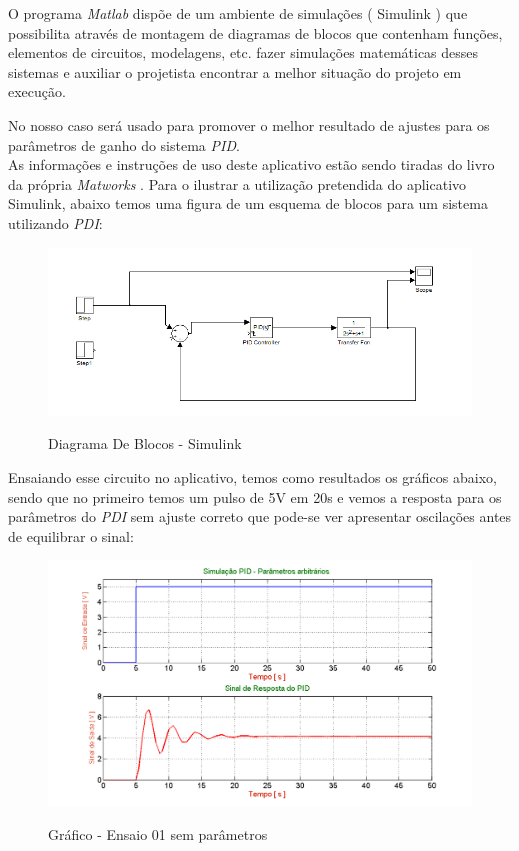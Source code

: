 O programa \emph{Matlab\tiny\textregistered} dispõe de um ambiente de simulações ( Simulink ) que possibilita através de montagem de diagramas de blocos que contenham funções, elementos de circuitos, modelagens, etc. fazer simulações matemáticas desses sistemas e auxiliar o projetista encontrar a melhor situação  do projeto em execução. 

No nosso caso será usado para promover o melhor resultado de ajustes para os parâmetros de ganho do sistema \emph{PID}.\\

As informações e instruções de uso deste aplicativo estão sendo tiradas do livro da própria \emph{Matworks \tiny\textcopyright}  \cite{userguide}.
Para o ilustrar a utilização pretendida do aplicativo Simulink, abaixo temos uma figura de um esquema de blocos para um sistema utilizando \emph{PDI}:

\begin{figure}[H]
		\centering
		\includegraphics[width=0.8\linewidth]{./ima/DiaBlocos01.png}
		\label{fig:fluxo1}
		\caption{Diagrama De Blocos - Simulink}
	\end{figure}
	
Ensaiando esse circuito no aplicativo, temos como resultados os gráficos abaixo, sendo que no primeiro temos um pulso de 5V em 20s  e vemos a resposta para os parâmetros do \emph{PDI} sem ajuste correto que pode-se ver apresentar oscilações antes de equilibrar o sinal:

\begin{figure}[H]
		\centering
		\includegraphics[width=0.9\linewidth]{./ima/GrafRegulado2.png}
		\label{fig:fluxo1}
		\caption{Gráfico - Ensaio 01 sem parâmetros}
	\end{figure}
	
